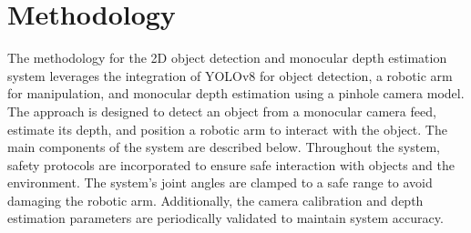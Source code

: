 \section{Methodology}

The methodology for the 2D object detection and monocular depth estimation system leverages the integration of YOLOv8 for object detection, a robotic arm for manipulation, and monocular depth estimation using a pinhole camera model. The approach is designed to detect an object from a monocular camera feed, estimate its depth, and position a robotic arm to interact with the object. The main components of the system are described below.
Throughout the system, safety protocols are incorporated to ensure safe interaction with objects and the environment. The system’s joint angles are clamped to a safe range to avoid damaging the robotic arm. Additionally, the camera calibration and depth estimation parameters are periodically validated to maintain system accuracy.